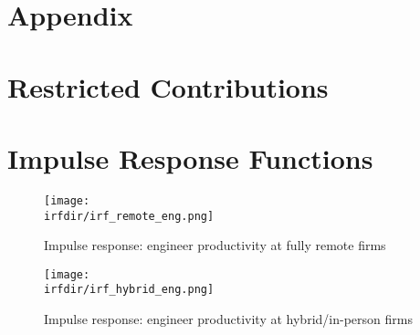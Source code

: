 \documentclass{article}
\newcommand{\cleanedresultsdir}{../../results/cleaned}
\newcommand{\irfdir}{../../results/user_irfs_eng_vs_noneng_remote_hybrid}
\begin{document}
\appendix
\section*{Appendix}
\section{Restricted Contributions}
\begin{table}[H]
  \centering
  
\end{table}

\section{Impulse Response Functions}
\begin{figure}[H]
  \centering
  \texttt{[image: \\irfdir/irf\_remote\_eng.png]}
  \caption{Impulse response: engineer productivity at fully remote firms}
\end{figure}

\begin{figure}[H]
  \centering
  \texttt{[image: \\irfdir/irf\_hybrid\_eng.png]}
  \caption{Impulse response: engineer productivity at hybrid/in-person firms}
\end{figure}
\end{document}
